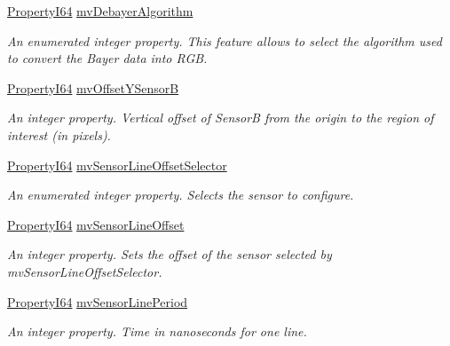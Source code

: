 \begin{DoxyCompactItemize}
\hyperlink{group___common_interface_ga81749b2696755513663492664a18a893}{Property\+I64} \hyperlink{classmv_i_m_p_a_c_t_1_1acquire_1_1_gen_i_cam_1_1_image_format_control_a859caad7f8c8da99428ad30eb7c23c90}{mv\+Debayer\+Algorithm}
\begin{DoxyCompactList}\small\item\em An enumerated integer property. This feature allows to select the algorithm used to convert the Bayer data into R\+G\+B. \end{DoxyCompactList}\item 
\hyperlink{group___common_interface_ga81749b2696755513663492664a18a893}{Property\+I64} \hyperlink{classmv_i_m_p_a_c_t_1_1acquire_1_1_gen_i_cam_1_1_image_format_control_a0e0b05208b8e91d1d1d70f09d7ccc9dd}{mv\+Offset\+Y\+Sensor\+B}
\begin{DoxyCompactList}\small\item\em An integer property. Vertical offset of Sensor\+B from the origin to the region of interest (in pixels). \end{DoxyCompactList}\item 
\hyperlink{group___common_interface_ga81749b2696755513663492664a18a893}{Property\+I64} \hyperlink{classmv_i_m_p_a_c_t_1_1acquire_1_1_gen_i_cam_1_1_image_format_control_a370dcf48c65b4970b4f22856fc7c5094}{mv\+Sensor\+Line\+Offset\+Selector}
\begin{DoxyCompactList}\small\item\em An enumerated integer property. Selects the sensor to configure. \end{DoxyCompactList}\item 
\hyperlink{group___common_interface_ga81749b2696755513663492664a18a893}{Property\+I64} \hyperlink{classmv_i_m_p_a_c_t_1_1acquire_1_1_gen_i_cam_1_1_image_format_control_a0dd5e96d70d8a3c73ce5ca9c6a1e09c9}{mv\+Sensor\+Line\+Offset}
\begin{DoxyCompactList}\small\item\em An integer property. Sets the offset of the sensor selected by mv\+Sensor\+Line\+Offset\+Selector. \end{DoxyCompactList}\item 
\hyperlink{group___common_interface_ga81749b2696755513663492664a18a893}{Property\+I64} \hyperlink{classmv_i_m_p_a_c_t_1_1acquire_1_1_gen_i_cam_1_1_image_format_control_ab0faf88fa51cd24bf5e07e234f41a7ab}{mv\+Sensor\+Line\+Period}
\begin{DoxyCompactList}\small\item\em An integer property. Time in nanoseconds for one line. \end{DoxyCompactList}\end{DoxyCompactItemize}


